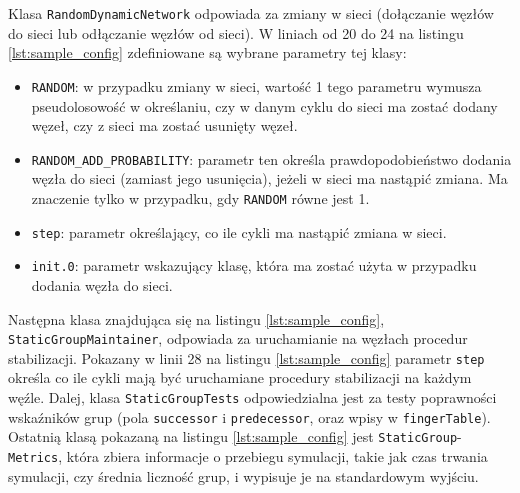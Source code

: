 \documentclass[12pt, twoside, openany]{report}
\begin{document}
Klasa \texttt{RandomDynamicNetwork} odpowiada za zmiany w sieci (dołączanie węzłów do sieci lub odłączanie węzłów od sieci). W liniach od 20 do 24 na listingu \ref{lst:sample_config} zdefiniowane są wybrane parametry tej klasy:
\begin{itemize}
\item \texttt{RANDOM}: w przypadku zmiany w sieci, wartość 1 tego parametru wymusza pseudolosowość w określaniu, czy w danym cyklu do sieci ma zostać dodany węzeł, czy z sieci ma zostać usunięty węzeł.
\item \texttt{RANDOM\_ADD\_PROBABILITY}: parametr ten określa prawdopodobieństwo dodania węzła do sieci (zamiast jego usunięcia), jeżeli w sieci ma nastąpić zmiana. Ma znaczenie tylko w przypadku, gdy \texttt{RANDOM} równe jest 1.
\item \texttt{step}: parametr określający, co ile cykli ma nastąpić zmiana w sieci.
\item \texttt{init.0}: parametr wskazujący klasę, która ma zostać użyta w przypadku dodania węzła do sieci.
\end{itemize}

Następna klasa znajdująca się na listingu \ref{lst:sample_config}, \texttt{StaticGroupMaintainer}, odpowiada za uruchamianie na węzłach procedur stabilizacji. Pokazany w linii 28 na listingu \ref{lst:sample_config} parametr \texttt{step} określa co ile cykli mają być uruchamiane procedury stabilizacji na każdym węźle. Dalej, klasa \texttt{StaticGroupTests} odpowiedzialna jest za testy poprawności wskaźników grup (pola \texttt{successor} i \texttt{predecessor}, oraz wpisy w \texttt{fingerTable}). Ostatnią klasą pokazaną na listingu \ref{lst:sample_config} jest \texttt{StaticGroup}-\texttt{Metrics}, która zbiera informacje o przebiegu symulacji, takie jak czas trwania symulacji, czy średnia liczność grup, i wypisuje je na standardowym wyjściu.
\end{document}
